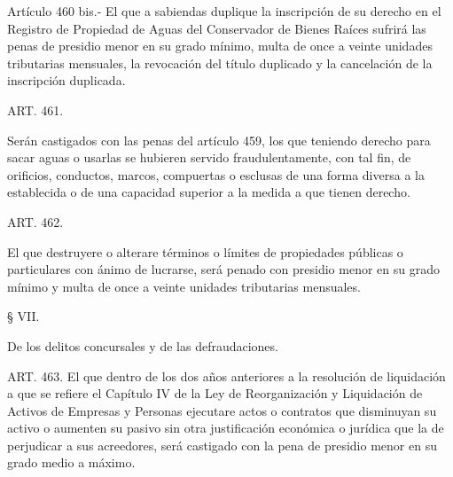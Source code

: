     Artículo 460 bis.- El que a sabiendas duplique la inscripción de su derecho en el Registro de Propiedad de Aguas del Conservador de Bienes Raíces sufrirá las penas de presidio menor en su grado mínimo, multa de once a veinte unidades tributarias mensuales, la revocación del título duplicado y la cancelación de la inscripción duplicada.



    ART. 461.

    Serán castigados con las penas del artículo 459, los que teniendo derecho para sacar aguas o usarlas se hubieren servido fraudulentamente, con tal fin, de orificios, conductos, marcos, compuertas o esclusas de una forma diversa a la establecida o de una capacidad superior a la medida a que tienen derecho.


    ART. 462.

    El que destruyere o alterare términos o límites de propiedades públicas o particulares con ánimo de lucrarse, será penado con presidio menor en su grado mínimo y multa de once a veinte unidades tributarias mensuales.








    § VII.

    De los delitos concursales y de las defraudaciones.




    ART. 463.
    El que dentro de los dos años anteriores a la resolución de liquidación a que se refiere el Capítulo IV de la Ley de Reorganización y Liquidación de Activos de Empresas y Personas ejecutare actos o contratos que disminuyan su activo o aumenten su pasivo sin otra justificación económica o jurídica que la de perjudicar a sus acreedores, será castigado con la pena de presidio menor en su grado medio a máximo.


